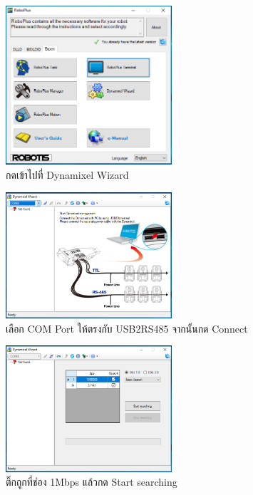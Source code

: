 {\begin{figure}[!ht]
    \centering
    \includegraphics[width=0.55\textwidth]{chapter3/images/roboplus/roboplus2.PNG}
    \caption*{กดเข้าไปที่ Dynamixel Wizard}
\end{figure}
\begin{figure}[!ht]
    \centering
    \includegraphics[width=0.55\textwidth]{chapter3/images/roboplus/roboplus3.PNG}
    \caption*{เลือก COM Port ให้ตรงกับ USB2RS485 จากนั้นกด Connect}
\end{figure}
\begin{figure}[!ht]
    \centering
    \includegraphics[width=0.55\textwidth]{chapter3/images/roboplus/roboplus4.PNG}
    \caption*{ติ๊กถูกที่ช่อง 1Mbps แล้วกด Start searching}
\end{figure}
\begin{figure}[!ht]
    \centering

\end{figure}}
